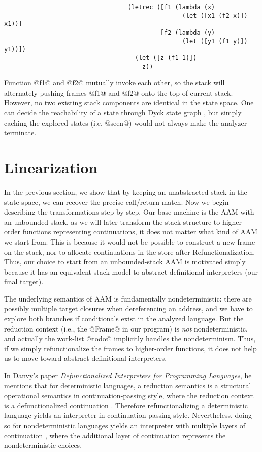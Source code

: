 \documentclass[acmsmall, review]{acmart}\settopmatter{}
\begin{document}
\begin{lstlisting}
                                  (letrec ([f1 (lambda (x)
                                                 (let ([x1 (f2 x)]) x1))]
                                           [f2 (lambda (y)
                                                 (let ([y1 (f1 y)]) y1))])
                                    (let ([z (f1 1)])
                                      z))
\end{lstlisting}

Function @f1@ and @f2@ mutually invoke each other, so the stack will alternately pushing
frames @f1@ and @f2@ onto the top of current stack. However, no two existing stack
components are identical in the state space. One can decide the reachability of a state
through Dyck state graph \cite{earl2010pushdown, earl2012introspective}, but simply
caching the explored states (i.e. @seen@) would not always make the analyzer terminate.


\section{Linearization} \label{linear}

In the previous section, we show that by keeping an unabstracted stack in the state
space, we can recover the precise call/return match. Now we begin describing the
transformations step by step. Our base machine is the AAM with an unbounded
stack, as we will later transform the stack structure to higher-order functions
representing continuations, it does not matter what kind of AAM we start from.
This is because it would not be possible to construct a new frame on the stack, nor
to allocate continuations in the store after Refunctionalization.
Thus, our choice to start from an unbounded-stack AAM is motivated simply because
it has an equivalent stack model to abstract definitional interpreters (our final target).

The underlying semantics of AAM is fundamentally nondeterministic: there are possibly
multiple target closures when dereferencing an address, and we have to explore both branches
if conditionals exist in the analyzed language. But the reduction context (i.e., the @Frame@ in
our program) is \emph{not} nondeterministic, and actually the work-list @todo@ implicitly
handles the nondeterminism. Thus, if we simply refunctionalize the frames to higher-order
functions, it does not help us to move toward abstract definitional interpreters.

In Danvy's paper \textit{Defunctionalized Interpreters for Programming Languages},
he mentions that for deterministic languages, a reduction semantics is a structural
operational semantics in continuation-passing style, where the reduction context is
a defunctionalized continuation \cite{Danvy:2008:DIP:1411204.1411206}. Therefore
refunctionalizing a deterministic language yields an interpreter in continuation-passing
style. Nevertheless, doing so for nondeterministic languages yields an interpreter
with multiple layers of continuation \cite{Danvy:2006:RW:2171265.2171268, DANVY2009534},
where the additional layer of continuation represents the nondeterministic choices.
\end{document}
